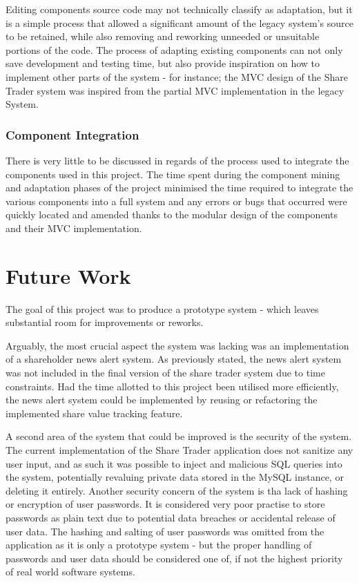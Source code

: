\documentclass[12pt, a4paper,titlepage]{article}
\begin{document}
Editing components source code may not technically classify as adaptation, but
it is a simple process that allowed a significant amount of the legacy system's
source to be retained, while also removing and reworking unneeded or
unsuitable portions of the code. 
The process of adapting existing components can not only save development and
testing time, but also provide inspiration on how to implement other parts of
the system - for instance; the MVC design of the Share Trader system was
inspired from the partial MVC implementation in the legacy System.

\subsubsection{Component Integration}
There is very little to be discussed in regards of the process used to
integrate the components used in this project. 
The time spent during the component mining and adaptation phases of the
project minimised the time required to integrate the various components into a
full system and any errors or bugs that occurred were quickly located and
amended thanks to the modular design of the components and their MVC
implementation.


\section{Future Work}
The goal of this project was to produce a prototype system - which leaves
substantial room for improvements or reworks.

Arguably, the most crucial aspect the system was lacking was an implementation
of a shareholder news alert system.
As previously stated, the news alert system was not included in the final
version of the share trader system due to time constraints.
Had the time allotted to this project been utilised more efficiently, the news
alert system could be implemented by reusing or refactoring the implemented
share value tracking feature.

A second area of the system that could be improved is the security of the
system.
The current implementation of the Share Trader application does not sanitize
any user input, and as such it was possible to inject and malicious SQL
queries into the system, potentially revaluing private data stored in the
MySQL instance, or deleting it entirely.
Another security concern of the system is tha lack of hashing or encryption of
user passwords.
It is considered very poor practise to store passwords as plain text due to
potential data breaches or accidental release of user data.
The hashing and salting of user passwords was omitted from the application as
it is only a prototype system - but the proper handling of passwords and user
data should be considered one of, if not the highest priority of real world
software systems.
\end{document}
